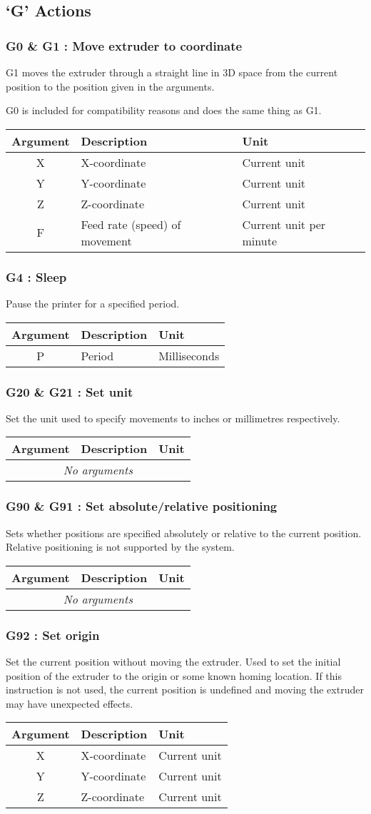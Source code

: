 		\newcommand{\gcodeaction}[4]{
			\subsubsection{#1 : #2}
				#3
				
				\begin{table}[H]
					\begin{tabular}{c p{0.41\textwidth} p{0.41\textwidth}}
						\toprule
						Argument & Description & Unit \\
						\midrule
						#4
						\bottomrule
					\end{tabular}
				\end{table}
		}
		\newcommand{\gcodearg}[3]{#1 & #2 & #3 \\}
		\newcommand{\gcodenoargs}{\multicolumn{3}{c}{\emph{No arguments}}\\}
		
		\subsection{`G' Actions}
			
			\gcodeaction{G0 \& G1}{Move extruder to coordinate}{
				G1 moves the extruder through a straight line in 3D space from the
				current position to the position given in the arguments.
				
				G0 is included for compatibility reasons and does the same thing as G1.
			}{
				\gcodearg{X}{X-coordinate}{Current unit}
				\gcodearg{Y}{Y-coordinate}{Current unit}
				\gcodearg{Z}{Z-coordinate}{Current unit}
				\gcodearg{F}{Feed rate (speed) of movement}{Current unit per minute}
			}
			
			\gcodeaction{G4}{Sleep}{
				Pause the printer for a specified period.
			}{
				\gcodearg{P}{Period}{Milliseconds}
			}
			
			\gcodeaction{G20 \& G21}{Set unit}{
				Set the unit used to specify movements to inches or millimetres
				respectively.
			}{
				\gcodenoargs
			}
			
			\gcodeaction{G90 \& G91}{Set absolute/relative positioning}{
				Sets whether positions are specified absolutely or relative to the
				current position. Relative positioning is not supported by the system.
			}{
				\gcodenoargs
			}
			
			\gcodeaction{G92}{Set origin}{
				Set the current position without moving the extruder. Used to set the
				initial position of the extruder to the origin or some known homing
				location. If this instruction is not used, the current position is
				undefined and moving the extruder may have unexpected effects.
			}{
				\gcodearg{X}{X-coordinate}{Current unit}
				\gcodearg{Y}{Y-coordinate}{Current unit}
				\gcodearg{Z}{Z-coordinate}{Current unit}
			}
		

